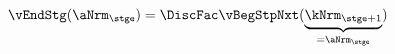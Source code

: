   \begin{equation}\begin{gathered}\begin{aligned}
\vEndStg(\aNrm_{\stge}) & = \DiscFac \vBegStpNxt(\underbrace{\kNrm_{\stge+1}}_{=\aNrm_{\stge}}) \label{eq:vEndStg}
      \end{aligned}\end{gathered}\end{equation}
